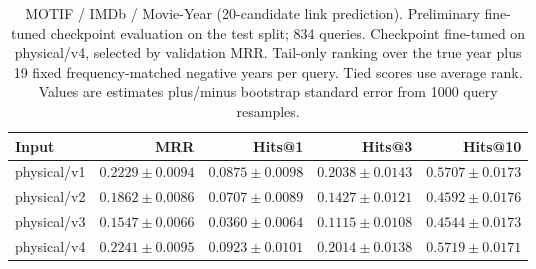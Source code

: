 \begin{table}[t]
\centering
\small
\begin{tabular}{lrrrr}
\toprule
Input & MRR & Hits@1 & Hits@3 & Hits@10 \\
\midrule
physical/v1 & $0.2229 \pm 0.0094$ & $0.0875 \pm 0.0098$ & $0.2038 \pm 0.0143$ & $0.5707 \pm 0.0173$ \\
physical/v2 & $0.1862 \pm 0.0086$ & $0.0707 \pm 0.0089$ & $0.1427 \pm 0.0121$ & $0.4592 \pm 0.0176$ \\
physical/v3 & $0.1547 \pm 0.0066$ & $0.0360 \pm 0.0064$ & $0.1115 \pm 0.0108$ & $0.4544 \pm 0.0173$ \\
physical/v4 & $0.2241 \pm 0.0095$ & $0.0923 \pm 0.0101$ & $0.2014 \pm 0.0138$ & $0.5719 \pm 0.0171$ \\
\bottomrule
\end{tabular}
\caption{MOTIF / IMDb / Movie-Year (20-candidate link prediction). Preliminary fine-tuned checkpoint evaluation on the test split; 834 queries. Checkpoint fine-tuned on physical/v4, selected by validation MRR. Tail-only ranking over the true year plus 19 fixed frequency-matched negative years per query. Tied scores use average rank. Values are estimates plus/minus bootstrap standard error from 1000 query resamples.}
\label{tab:motif-movie_year-link_prediction}
\end{table}
